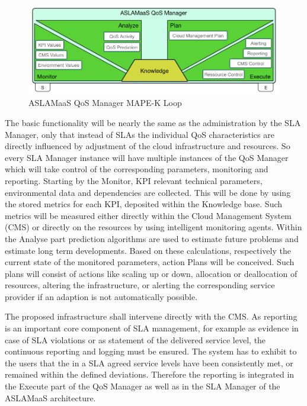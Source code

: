 \begin{figure}[!ht]
\centering
\includegraphics[width=5.3in]{chapters/chapter4/fig/QoSMan.PNG}
\caption{ASLAMaaS QoS Manager MAPE-K Loop }
\label{fig_QoSManager}
\end{figure}

The basic functionality will be nearly the same as the administration by the SLA Manager, only that instead of SLAs the individual QoS characteristics are directly influenced by adjustment of the cloud infrastructure and resources. So every SLA Manager instance will have multiple instances of the QoS Manager which will take control of the corresponding parameters, monitoring and reporting. Starting by the Monitor, KPI relevant technical parameters, environmental data and dependencies are collected. This will be done by using the stored metrics for each KPI, deposited within the Knowledge base. Such metrics will be measured either directly within the Cloud Management System (CMS) or directly on the resources by using intelligent monitoring agents. Within the Analyse part prediction algorithms are used to estimate future problems and estimate long term developments. Based on these calculations, respectively the current state of the monitored parameters,  action Plans will be conceived. Such plans will consist of actions like scaling up or down, allocation or deallocation of resources, altering the infrastructure, or alerting the corresponding service provider if an adaption is not automatically possible. 

The proposed infrastructure shall intervene directly with the CMS. As reporting is an important core component of SLA management, for example as evidence in case of SLA violations or as statement of the delivered service level, the continuous reporting and logging must be ensured. The system has to exhibit to the users that the in a SLA agreed service levels have been consistently met, or remained within the defined deviations. Therefore the reporting is integrated in the Execute part of the QoS Manager as well as in the SLA Manager of the ASLAMaaS architecture.


